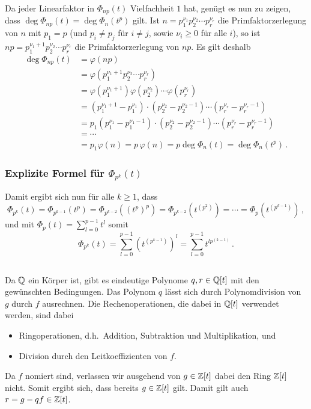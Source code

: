 Da jeder Linearfaktor in $\Phi_{np}(t)$ Vielfachheit $1$ hat, genügt es nun zu zeigen, dass $\deg \Phi_{np}(t) = \deg \Phi_n(t^p)$ gilt.
Ist $n = p_1^{\nu_1} p_2^{\nu_2} \dotsm p_r^{\nu_r}$ die Primfaktorzerlegung von $n$ mit $p_1 = p$ (und $p_i \neq p_j$ für $i \neq j$, sowie $\nu_i \geq 0$ für alle $i$), so ist $np = p_1^{\nu_1 + 1} p_2^{\nu_2} \dotsm p_r^{\nu_r}$ die Primfaktorzerlegung von $np$.
Es gilt deshalb
\begin{align*}
      \deg \Phi_{np}(t)
  &=  \varphi(np)
  \\
  &=  \varphi( p_1^{\nu_1 + 1} p_2^{\nu_2} \dotsm p_r^{\nu_r} )
  \\
  &=  \varphi( p_1^{\nu_1 + 1} ) \varphi( p_2^{\nu_2} ) \dotsm \varphi( p_r^{\nu_r} )
  \\
  &=  (p_1^{\nu_1 + 1} - p_1^{\nu_1}) \cdot ( p_2^{\nu_2} - p_2^{\nu_2 - 1} ) \dotsm ( p_r^{\nu_r} - p_r^{\nu_r - 1})
  \\
  &= p_1 (p_1^{\nu_1} - p_1^{\nu_1 - 1}) \cdot ( p_2^{\nu_2} - p_2^{\nu_2 - 1} ) \dotsm ( p_r^{\nu_r} - p_r^{\nu_r - 1})
  \\
  &= \dotsb
  \\
  &= p_1 \varphi(n)
   = p \, \varphi(n)
   = p \deg \Phi_n(t)
   = \deg \Phi_n(t^p)\,.
\end{align*}



\subsubsection*{Explizite Formel für $\Phi_{p^k}(t)$}

Damit ergibt sich nun für alle $k \geq 1$, dass
\[
    \Phi_{p^k}(t)
  = \Phi_{p^{k-1}}(t^p)
  = \Phi_{p^{k-2}}((t^p)^p)
  = \Phi_{p^{k-2}}\left( t^{(p^2)} \right)
  = \dotsb
  = \Phi_p\left( t^{(p^{k-1})} \right)\,,
\]
und mit $\Phi_p(t) = \sum_{l=0}^{p-1} t^l$ somit
\[
    \Phi_{p^k}(t)
  = \sum_{l=0}^{p-1} \left( t^{(p^{k-1})} \right)^l
  = \sum_{l=0}^{p-1} t^{l p^{(k-1)}}\,.
\]





\subsection{}

Da $\mathbb{Q}$ ein Körper ist, gibt es eindeutige Polynome $q, r \in \mathbb{Q}[t]$ mit den gewünschten Bedingungen.
Das Polynom $q$ lässt sich durch Polynomdivision von $g$ durch $f$ ausrechnen.
Die Rechenoperationen, die dabei in $\mathbb{Q}[t]$ verwendet werden, sind dabei
\begin{itemize}
  \item
    Ringoperationen, d.h.\ Addition, Subtraktion und Multiplikation, und
  \item
    Division durch den Leitkoeffizienten von $f$.
\end{itemize}
Da $f$ nomiert sind, verlassen wir ausgehend von $g \in \mathbb{Z}[t]$ dabei den Ring $\mathbb{Z}[t]$ nicht.
Somit ergibt sich, dass bereits $g \in \mathbb{Z}[t]$ gilt.
Damit gilt auch $r = g - qf \in \mathbb{Z}[t]$.

